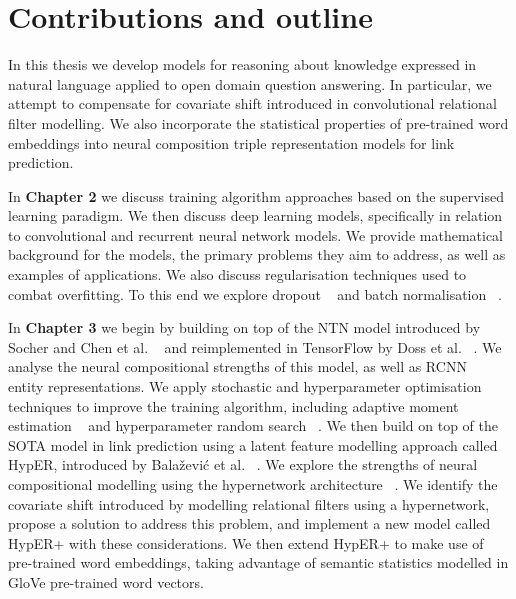 
\section{Contributions and outline} %

\noindent In this thesis we develop models for reasoning about knowledge expressed in natural language applied to open domain question answering. In particular, we attempt to compensate for covariate shift introduced in convolutional relational filter modelling. We also incorporate the statistical properties of pre-trained word embeddings into neural composition triple representation models for link prediction. \par

\noindent In \textbf{Chapter 2} we discuss training algorithm approaches based on the supervised learning paradigm. We then discuss deep learning models, specifically in relation to convolutional and recurrent neural network models. We provide mathematical background for the models, the primary problems they aim to address, as well as examples of applications. We also discuss regularisation techniques used to combat overfitting. To this end we explore dropout \unskip ~\citep{srivastava2014dropout} and batch normalisation \unskip ~\citep{ioffe2015batch}. \par

\noindent In \textbf{Chapter 3} we begin by building on top of the NTN model introduced by Socher and Chen et al. \unskip ~\citep{socher2013reasoning} and reimplemented in TensorFlow by Doss et al. \unskip ~\citep{Doss2015}. We analyse the neural compositional strengths of this model, as well as RCNN \unskip ~\citep{socher2012semantic} entity representations.  We apply stochastic and hyperparameter optimisation techniques to improve the training algorithm, including adaptive moment estimation ~\citep{kingma2014adam} and hyperparameter random search \unskip ~\citep{bergstra2012random}. We then build on top of the SOTA model in link prediction using a latent feature modelling approach called HypER, introduced by Bala\v{z}evi\'c et al. \unskip ~\citep{balazevic2019hypernetwork}. We explore the strengths of neural compositional modelling using the hypernetwork architecture \unskip ~\citep{ha2016hypernetworks}. We identify the covariate shift introduced by modelling relational filters using a hypernetwork, propose a solution to address this problem, and implement a new model called HypER+ with these considerations. We then extend HypER+ to make use of pre-trained word embeddings, taking advantage of semantic statistics modelled in GloVe pre-trained word vectors. \par

